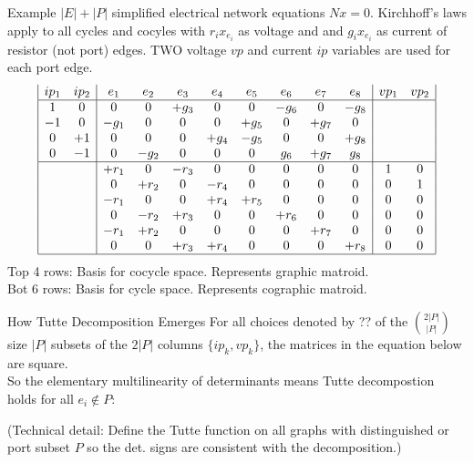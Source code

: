 \documentclass{beamer}
\begin{document}
\begin{frame}{Example}
$|E|+|P|$ 
simplified electrical network equations $Nx=0$.   
Kirchhoff's laws
apply to all cycles and cocyles with $r_ix_{e_i}$ as voltage and 
and $g_ix_{e_i}$ as current of resistor (not port) edges.  TWO 
voltage $vp$ and
current $ip$ variables are used for each port edge.
\[
\begin{array}{|cc|cccccccc|cc|}
ip_1 & ip_2  & e_1 & e_2 & e_3 & e_4 & e_5 & e_6 & e_7 & e_8 & vp_1 & vp_2 \\ \hline
 1   &  0   &  0  &  0  &+g_3 &  0  &  0  &-g_6 &  0  &-g_8 &      &      \\
-1   &  0   &-g_1 &  0  &  0  &  0  &+g_5 &  0  &+g_7 &  0  &      &      \\
 0   & +1   &  0  &  0  &  0  &+g_4 &-g_5 &  0  &  0  &+g_8 &      &      \\
 0   & -1   &  0  &-g_2 &  0  &  0  &  0  & g_6 &+g_7 & g_8 &      &   \\ \hline
     &      &+r_1 &  0  &-r_3 &  0  &  0  &  0  &  0  &  0  &  1   &  0   \\
     &      &  0  &+r_2 &  0  &-r_4 &  0  &  0  &  0  &  0  &  0   &  1   \\
     &      &-r_1 &  0  &  0  &+r_4 &+r_5 &  0  &  0  &  0  &  0   &  0   \\
     &      &  0  &-r_2 &+r_3 &  0  &  0  &+r_6 &  0  &  0  &  0   &  0   \\
     &      &-r_1 &+r_2 &  0  &  0  &  0  &  0  &+r_7 &  0  &  0   &  0   \\
     &      &  0  &  0  &+r_3 &+r_4 &  0  &  0  &  0  &+r_8 &  0   &  0\\ \hline 
\end{array}
\]
Top 4 rows: Basis for cocycle space. Represents graphic matroid.\\
Bot 6 rows: Basis for cycle space. Represents cographic matroid.\\
\end{frame}

\begin{frame}{How Tutte Decomposition Emerges}
For all choices denoted by ?? of the $\binom{2|P|}{|P|}$ size $|P|$ subsets of
the $2|P|$ columns $\{ip_k, vp_k\}$, the matrices in the equation below are
square.\\
So the elementary multilinearity of determinants
means Tutte decompostion holds for all $e_i\not\in P$:
  


(Technical detail:  Define the Tutte function on all graphs with 
distinguished or port subset $P$ so the det. signs are consistent 
with the decomposition.)
\end{frame}
\end{document}
